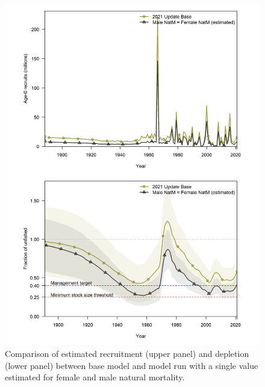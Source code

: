 \documentclass[11pt,
  english,
  a4paper,
]{article}
\begin{document}
\begin{figure}
\centering
\includegraphics[width=1\textwidth,height=1\textheight]{figs/singleM_sens.png}
\caption{Comparison of estimated recruitment (upper panel) and depletion (lower panel) between base model and model run with a single value estimated for female and male natural mortality. \label{fig:singleM}}
\end{figure}

\tagmcend\tagstructend

\end{document}
